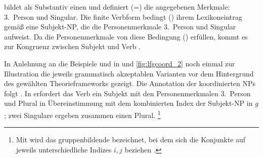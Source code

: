  bildet als Substantiv einen  und definiert (=) die
angegebenen Merk\-male: 3.~Person und Singular. Die finite Verbform 
bedingt (\req) ihrem Lexikoneintrag gemäß eine Subjekt-NP, die die
Personenmerkmale 3.~Person und Singular aufweist. Da die Personenmerkmale von
 diese Bedingung () erfüllen, kommt es
zur Kongruenz zwischen Subjekt und Verb \autocite[vgl.][59]{bresnanetal2016}.

In Anlehnung an die Beispiele  und  in
 und \ref{fig:lfgcoord_2} noch einmal zur Illustration
die jeweils grammatisch akzeptablen Varianten vor dem Hintergrund des gewählten
Theorieframeworks gezeigt. Die Annotation der koordinierten NPs
folgt \citet{peterson2004}. In  erfordert das Verb
 ein Subjekt mit den Personenmerkmalen 3.~Person und Plural in
Übereinstimmung mit dem kombinierten Index der Subjekt-NP in $g$; zwei
Singulare ergeben zusammen einen Plural.%
%
	\footnote{Mit  wird das gruppenbildende  bezeichnet, bei
		dem sich die Konjunkte auf jeweils unterschiedliche Indizes $i, j$
		beziehen \autocite[382--383]{dalrymple2001}.}

